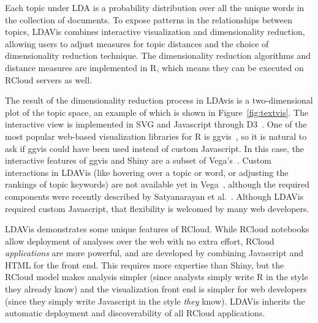 Each topic under LDA is a probability distribution over all the unique
words in the collection of documents. To expose patterns in the relationships
between topics, LDAVis combines
interactive visualization and dimensionality reduction,
allowing users to adjust measures for topic distances and the choice
of dimensionality reduction technique. The dimensionality reduction
algorithms and distance measures are implemented in R, which
means they can be executed on RCloud servers as well.

The result of the dimensionality reduction process in LDAvis is a
two-dimensional plot of the topic space, an example of which is shown in
Figure~\ref{fig:textvis}. The interactive view is implemented in SVG
and Javascript through D3~\cite{Bostock:2011:DDD}. One of the most
popular web-based visualization libraries for R is ggvis~\cite{ggvis},
so it is natural to ask if ggvis could have been used instead of
custom Javascript. In this case, the interactive features of ggvis
and Shiny are a subset of Vega's~\cite{vega}.
Custom interactions in LDAVis (like hovering over a topic or word, or adjusting the 
rankings of topic keywords) are not available yet in Vega~\cite{vega},
although the required components were recently described by Satyanarayan et
al.~\cite{Satyanarayan:2014:DID}.
Although LDAVis required custom Javascript, that flexibility is welcomed
by many web developers.

LDAVis demonstrates some unique features of RCloud.
While RCloud notebooks allow deployment of analyses over
the web with no extra effort, RCloud \emph{applications} are more
powerful, and are developed by combining Javascript and HTML
for the front end. This requires more expertise than Shiny, but
the RCloud model makes analysis simpler (since analysts
simply write R in the style they already know)
and the visualization front end is simpler for web
developers (since they simply write Javascript in
the style \emph{they} know).
LDAVis inherits the automatic deployment and discoverability
of all RCloud applications.

%
